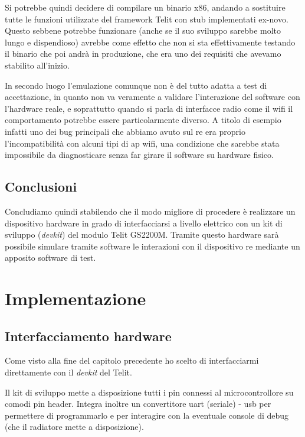 \documentclass[12pt,a4paper,twoside,titlepage]{book}
\begin{document}
Si potrebbe quindi decidere di compilare un binario x86, andando a sostituire tutte
le funzioni utilizzate del framework Telit con stub implementati ex-novo. Questo
sebbene potrebbe funzionare (anche se il suo sviluppo sarebbe molto lungo e dispendioso)
avrebbe come effetto che non si sta effettivamente testando il binario che poi andrà
in produzione, che era uno dei requisiti che avevamo stabilito all'inizio.

In secondo luogo l'emulazione comunque non è del tutto adatta a test di accettazione, in quanto non va veramente 
a validare l'interazione del software con l'hardware reale, e soprattutto quando si parla di interfacce radio 
come il \Gls{wifi} il comportamento potrebbe essere particolarmente diverso. A titolo di esempio infatti 
uno dei bug principali che abbiamo avuto sul \acrshort{re} era proprio l'incompatibilità con alcuni tipi di \acrlong{ap}
\Gls{wifi}, una condizione che sarebbe stata impossibile da diagnosticare senza far girare il software su hardware fisico.

\section{Conclusioni}

Concludiamo quindi stabilendo che il modo migliore di procedere è realizzare un dispositivo hardware in 
grado di interfacciarsi a livello elettrico con un kit di sviluppo (\textit{devkit}) del modulo Telit GS2200M. 
Tramite questo hardware sarà possibile simulare tramite software le interazioni con il dispositivo \acrshort{re}
mediante un apposito software di test.

\chapter{Implementazione}

\section{Interfacciamento hardware}

Come visto alla fine del capitolo precedente ho scelto di interfacciarmi direttamente con il \textit{devkit} 
del Telit. 

Il kit di sviluppo mette a disposizione tutti i pin connessi al microcontrollore
su comodi pin header. Integra inoltre un convertitore \Gls{uart} (seriale) - \acrshort{usb} per
permettere di programmarlo e per interagire con la eventuale console di debug
(che il radiatore mette a disposizione).
\end{document}
